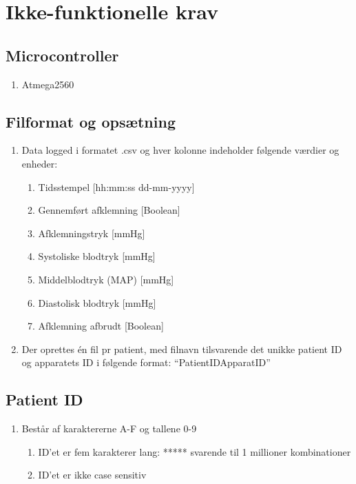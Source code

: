 	\chapter{Ikke-funktionelle krav }
	
	\section{Microcontroller}
	\begin{enumerate}
		\setlength\itemsep{0cm}
		\item Atmega2560
		\end{enumerate}
	
	\section{Filformat og opsætning}
	\begin{enumerate}
		\setlength\itemsep{0cm} %
		\item Data logged i formatet .csv og hver kolonne indeholder følgende værdier og enheder: 
		\begin{enumerate}
			\item Tidsstempel [hh:mm:ss dd-mm-yyyy]
			\item Gennemført afklemning [Boolean]
			\item Afklemningstryk [mmHg]
			\item Systoliske blodtryk [mmHg]
			\item Middelblodtryk (MAP) [mmHg]
			\item Diastolisk blodtryk [mmHg]
			\item Afklemning afbrudt [Boolean]
		\end{enumerate}
		\item Der oprettes én fil pr patient, med filnavn tilsvarende det unikke patient ID og apparatets ID i følgende format: “PatientIDApparatID”
	\end{enumerate}
	
	\section{Patient ID}
	\begin{enumerate}
		\setlength\itemsep{0cm} %
		\item Består af karaktererne A-F og tallene 0-9
		\begin{enumerate}
			\item ID’et er fem karakterer lang: ***** svarende til 1 millioner kombinationer
			\item ID’et er ikke case sensitiv
		\end{enumerate}
	\end{enumerate}
	
